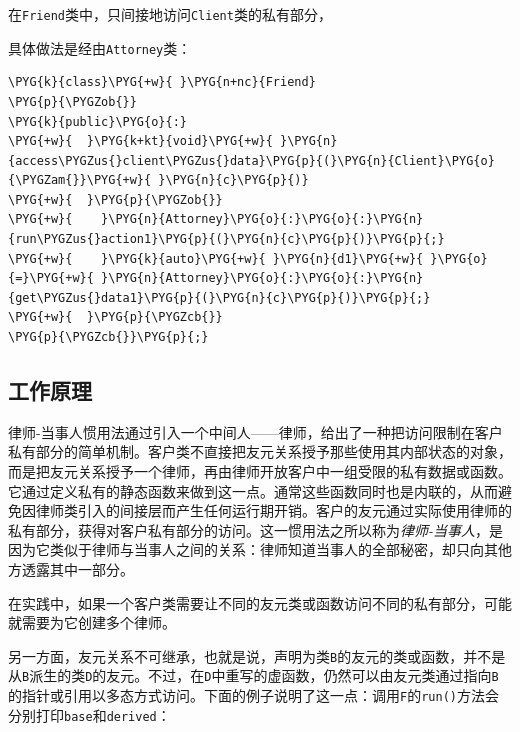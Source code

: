 
在\texttt{Friend}类中，只间接地访问\texttt{Client}类的私有部分，



具体做法是经由\texttt{Attorney}类：



\begin{codeblockbg}
\begin{Verbatim}[commandchars=\\\{\},breaklines=true,breakanywhere=true,fontsize=\codefont,xleftmargin=17bp]
\PYG{k}{class}\PYG{+w}{ }\PYG{n+nc}{Friend}
\PYG{p}{\PYGZob{}}
\PYG{k}{public}\PYG{o}{:}
\PYG{+w}{  }\PYG{k+kt}{void}\PYG{+w}{ }\PYG{n}{access\PYGZus{}client\PYGZus{}data}\PYG{p}{(}\PYG{n}{Client}\PYG{o}{\PYGZam{}}\PYG{+w}{ }\PYG{n}{c}\PYG{p}{)}
\PYG{+w}{  }\PYG{p}{\PYGZob{}}
\PYG{+w}{    }\PYG{n}{Attorney}\PYG{o}{:}\PYG{o}{:}\PYG{n}{run\PYGZus{}action1}\PYG{p}{(}\PYG{n}{c}\PYG{p}{)}\PYG{p}{;}
\PYG{+w}{    }\PYG{k}{auto}\PYG{+w}{ }\PYG{n}{d1}\PYG{+w}{ }\PYG{o}{=}\PYG{+w}{ }\PYG{n}{Attorney}\PYG{o}{:}\PYG{o}{:}\PYG{n}{get\PYGZus{}data1}\PYG{p}{(}\PYG{n}{c}\PYG{p}{)}\PYG{p}{;}
\PYG{+w}{  }\PYG{p}{\PYGZcb{}}
\PYG{p}{\PYGZcb{}}\PYG{p}{;}
\end{Verbatim}
\end{codeblockbg}



\subsection{工作原理}



律师-当事人惯用法通过引入一个中间人——律师，给出了一种把访问限制在客户私有部分的简单机制。客户类不直接把友元关系授予那些使用其内部状态的对象，而是把友元关系授予一个律师，再由律师开放客户中一组受限的私有数据或函数。它通过定义私有的静态函数来做到这一点。通常这些函数同时也是内联的，从而避免因律师类引入的间接层而产生任何运行期开销。客户的友元通过实际使用律师的私有部分，获得对客户私有部分的访问。这一惯用法之所以称为\textit{律师-当事人}，是因为它类似于律师与当事人之间的关系：律师知道当事人的全部秘密，却只向其他方透露其中一部分。



在实践中，如果一个客户类需要让不同的友元类或函数访问不同的私有部分，可能就需要为它创建多个律师。


另一方面，友元关系不可继承，也就是说，声明为类\texttt{B}的友元的类或函数，并不是从\texttt{B}派生的类\texttt{D}的友元。不过，在\texttt{D}中重写的虚函数，仍然可以由友元类通过指向\texttt{B}的指针或引用以多态方式访问。下面的例子说明了这一点：调用\texttt{F}的\texttt{run()}方法会分别打印\texttt{base}和\texttt{derived}：


